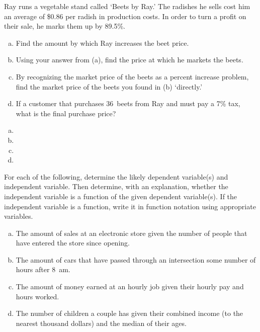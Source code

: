 \documentclass[11pt,letterpaper]{article}
\begin{document}

 Ray runs a vegetable stand called `Beets by Ray.' The radishes he sells cost him an average of \$0.86 per radish in production costs. In order to turn a profit on their sale, he marks them up by 89.5\%.
	\begin{enumerate}[(a)]
	\item Find the amount by which Ray increases the beet price.
	\item Using your answer from (a), find the price at which he markets the beets.
	\item By recognizing the market price of the beets as a percent increase problem, find the market price of the beets you found in (b) `directly.'
	\item If a customer that purchases 36~beets from Ray and must pay a 7\% tax, what is the final purchase price?
	\end{enumerate} \pspace

\sol
\begin{enumerate}[(a)]
\item 
\item 
\item 
\item 
\end{enumerate}



\newpage



 For each of the following, determine the likely dependent variable(s) and independent variable. Then determine, with an explanation, whether the independent variable is a function of the given dependent variable(s). If the independent variable is a function, write it in function notation using appropriate variables. 
	\begin{enumerate}[(a)]
	\item The amount of sales at an electronic store given the number of people that have entered the store since opening. 
	\item The amount of cars that have passed through an intersection some number of hours after 8~am.
	\item The amount of money earned at an hourly job given their hourly pay and hours worked.
	\item The number of children a couple has given their combined income (to the nearest thousand dollars) and the median of their ages. 
	\end{enumerate} \pspace
\end{document}
